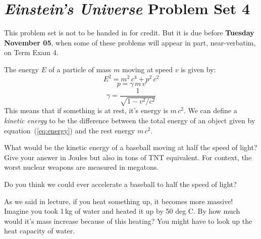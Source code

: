 \documentclass[12pt, letterpaper]{article}
\begin{document}
\section*{\textsl{Einstein's Universe} Problem Set 4}

This problem set is not to be handed in for credit. But it is due
before \textbf{Tuesday November 05}, when some of these problems
will appear in part, near-verbatim, on Term Exam 4.

\begin{problem}
The energy $E$ of a particle of mass $m$ moving
at speed $v$ is given by:
\begin{equation}\label{eq:energy}
E^2 = m^2\,c^4 + p^2\,c^2
\end{equation}
\begin{equation}
p = \gamma\,m\,v
\end{equation}
\begin{equation}
\gamma = \frac{1}{\sqrt{1 - v^2/c^2}}
\end{equation}
This means that if something is at rest, it's energy is $m\,c^2$.
We can define a \emph{kinetic energy} to be the difference
between the total energy of an object given by
equation~(\ref{eq:energy}) and the rest energy $m\,c^2$.

What would be the kinetic energy of a baseball moving at half the
speed of light? Give your answer in Joules but also in tons of TNT
equivalent. For context, the worst nuclear weapons are measured in
megatons.

Do you think we could ever accelerate a baseball to half the speed of
light?
\end{problem}

\begin{problem}
As we said in lecture, if you heat something up, it becomes more
massive! Imagine you took 1\,kg of water and heated it up by 50 deg
C. By how much would it's mass increase because of this heating?
You might have to look up the heat capacity of water.
\end{problem}
\end{document}
